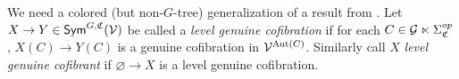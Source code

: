 \documentclass[a4paper,10pt
,draft
]{article}%
\renewcommand{\F}{\mathcal F}
\renewcommand{\1}{\eta}%
\newcommand{\SC}{\Sigma_{\mathfrak C}}
\newcommand{\UC}{\underline{\mathfrak C}}
\begin{document}


We need a colored (but non-$G$-tree) generalization of a result from \cite{BP_geo}.
Let $X \to Y \in \mathsf{Sym}^{G, \mathfrak C}(\mathcal V)$ be called a \textit{level genuine cofibration} if for each $C \in \G \ltimes \SC^{op}$,
$X(C) \to Y(C)$ is a genuine cofibration in $\mathcal V^{\operatorname{Aut}(C)}$.
Similarly call $X$ \textit{level genuine cofibrant} if $\varnothing \to X$ is a level genuine cofibration.
\end{document}
